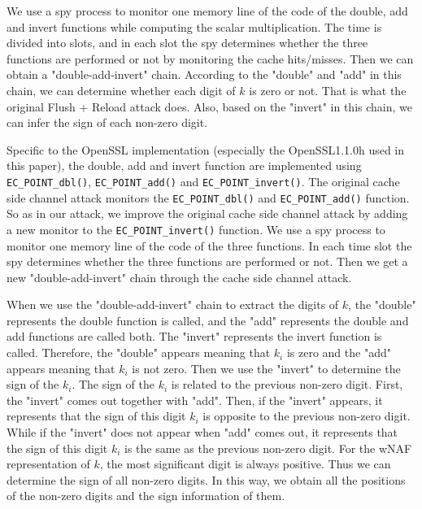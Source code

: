 We use a spy process to monitor one memory line of the code of the double, add and invert functions while computing the scalar multiplication.
The time is divided into slots, and in each slot
  the spy determines whether the three functions are performed or not by monitoring the cache hits/misses.
 Then we can obtain a "double-add-invert" chain.
According to the "double" and "add" in this chain, we can determine whether each digit of $k$ is zero or not.
  That is what the original Flush + Reload attack does.
Also, based on the "invert" in this chain, we can infer the sign of each non-zero digit.


Specific to the OpenSSL implementation (especially the OpenSSL1.1.0h used in this paper), 
  the double, add and invert function are implemented using  \verb+EC_POINT_dbl()+, \verb+EC_POINT_add()+ and \verb+EC_POINT_invert()+.
 The original cache side channel attack monitors the \verb+EC_POINT_dbl()+ and \verb+EC_POINT_add()+ function.
So as in our attack, we improve the original cache side channel attack by adding a new monitor to the \verb+EC_POINT_invert()+ function.
We use a spy process to monitor one memory line of the code of the three functions.
 In each time slot
  the spy determines whether the three functions are performed or not.
Then we get a new "double-add-invert" chain through the cache side channel attack.



When we use the "double-add-invert" chain to extract the digits of $k$,
the "double" represents the double function is called,  
and the "add" represents the double and add functions are called both.    
The "invert" represents the invert function is called. 
Therefore,
 the "double" appears meaning that $k_i$ is zero
and the "add" appears meaning that $k_i$ is not zero.
 Then we use the "invert" to determine the sign of the $k_i$.
The sign of the $k_i$ is related to the previous non-zero digit.
First, the "invert" comes out together with "add".
 Then, if the "invert" appears, it represents that the sign of this digit $k_i$ is opposite to the previous non-zero digit.
 While if the "invert" does not appear when "add" comes out, it represents that
the sign of this digit $k_i$ is the same as the previous non-zero digit.
 For the wNAF representation of $k$, the most significant digit is always positive.
 Thus we can determine the sign of all non-zero digits.
In this way, we obtain all the positions of the non-zero digits and the sign information of them.


